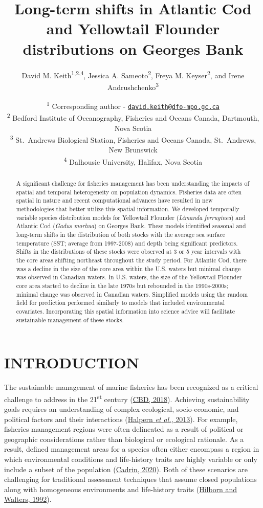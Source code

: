 \documentclass[
]{article}
\title{Long-term shifts in Atlantic Cod and Yellowtail Flounder distributions on Georges Bank}
\author{David M. Keith\textsuperscript{1,2,4},
Jessica A. Sameoto\textsuperscript{2},
Freya M. Keyser\textsuperscript{2}, and
Irene Andrushchenko\textsuperscript{3}}
\date{\textsuperscript{1} Corresponding author - \href{mailto:david.keith@dfo-mpo.gc.ca}{\nolinkurl{david.keith@dfo-mpo.gc.ca}}\\
\textsuperscript{2} Bedford Institute of Oceanography, Fisheries and Oceans Canada, Dartmouth, Nova Scotia\\
\textsuperscript{3} St.~Andrews Biological Station, Fisheries and Oceans Canada, St.~Andrews, New Brunswick\\
\textsuperscript{4} Dalhousie University, Halifax, Nova Scotia\\}
\begin{document}
\maketitle
\begin{abstract}
A significant challenge for fisheries management has been understanding the impacts of spatial and temporal heterogeneity on population dynamics. Fisheries data are often spatial in nature and recent computational advances have resulted in new methodologies that better utilize this spatial information. We developed temporally variable species distribution models for Yellowtail Flounder (\emph{Limanda ferruginea}) and Atlantic Cod (\emph{Gadus morhua}) on Georges Bank. These models identified seasonal and long-term shifts in the distribution of both stocks with the average sea surface temperature (SST; average from 1997-2008) and depth being significant predictors. Shifts in the distributions of these stocks were observed at 3 or 5 year intervals with the core areas shifting northeast throughout the study period. For Atlantic Cod, there was a decline in the size of the core area within the U.S. waters but minimal change was observed in Canadian waters. In U.S. waters, the size of the Yellowtail Flounder core area started to decline in the late 1970s but rebounded in the 1990s-2000s; minimal change was observed in Canadian waters. Simplified models using the random field for prediction performed similarly to models that included environmental covariates. Incorporating this spatial information into science advice will facilitate sustainable management of these stocks.
\end{abstract}

\hypertarget{ref-intro}{%
\section{INTRODUCTION}\label{ref-intro}}

The sustainable management of marine fisheries has been recognized as a critical challenge to address in the 21\textsuperscript{st} century (\protect\hyperlink{ref-cbdAichiBiodiversityTargets2018}{CBD, 2018}). Achieving sustainability goals requires an understanding of complex ecological, socio-economic, and political factors and their interactions (\protect\hyperlink{ref-halpernAchievingTripleBottom2013}{Halpern \emph{et al.}, 2013}). For example, fisheries management regions were often delineated as a result of political or geographic considerations rather than biological or ecological rationale. As a result, defined management areas for a species often either encompass a region in which environmental conditions and life-history traits are highly variable or only include a subset of the population (\protect\hyperlink{ref-cadrinDefiningSpatialStructure2020a}{Cadrin, 2020}). Both of these scenarios are challenging for traditional assessment techniques that assume closed populations along with homogeneous environments and life-history traits (\protect\hyperlink{ref-hilbornQuantitativeFisheriesStock1992}{Hilborn and Walters, 1992}).
\end{document}
